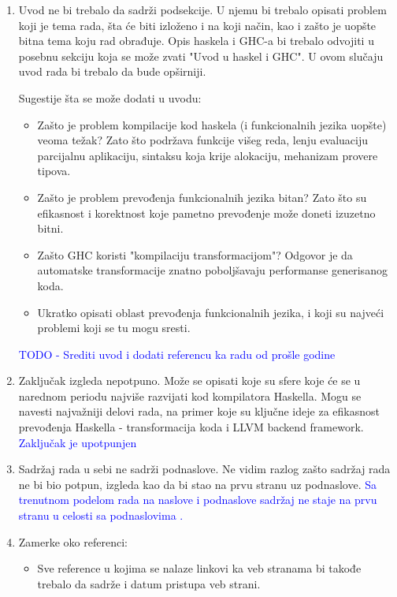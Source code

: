 \documentclass[a4paper]{report}
\newcommand{\odgovor}[1]{\textcolor{blue}{#1}}
\begin{document}
	\begin{enumerate}  
		
		\item Uvod ne bi trebalo da sadrži podsekcije. U njemu bi trebalo opisati problem koji je tema rada, šta će biti izloženo i na koji način, kao i zašto je uopšte bitna tema koju rad obrađuje. Opis haskela i GHC-a bi trebalo odvojiti u posebnu sekciju koja se može zvati "Uvod u haskel i GHC". U ovom slučaju uvod rada bi trebalo da bude opširniji. 
		
		Sugestije šta se može dodati u uvodu:
		\begin{itemize}
			\item Zašto je problem kompilacije kod haskela (i funkcionalnih jezika uopšte) veoma težak? Zato što podržava funkcije višeg reda, lenju evaluaciju parcijalnu aplikaciju, sintaksu koja krije alokaciju, mehanizam provere tipova.
			
			\item Zašto je problem prevođenja funkcionalnih jezika bitan? Zato što su efikasnost i korektnost koje pametno prevođenje može doneti izuzetno bitni. 
			
			\item Zašto GHC koristi "kompilaciju transformacijom"? Odgovor je da automatske transformacije znatno poboljšavaju performanse generisanog koda.
			
			\item Ukratko opisati oblast prevođenja funkcionalnih jezika, i koji su najveći problemi koji se tu mogu sresti.
		\end{itemize}
		\odgovor{TODO - Srediti uvod i dodati referencu ka radu od prošle godine}
		
		
		\item Zaključak izgleda nepotpuno. Može se opisati koje su sfere koje će se u narednom periodu najviše razvijati kod kompilatora Haskella. Mogu se navesti najvažniji delovi rada, na primer koje su ključne ideje za efikasnost prevođenja Haskella - transformacija koda i LLVM backend framework.
		\odgovor{Zaključak je upotpunjen}
		
		
		\item Sadržaj rada u sebi ne sadrži podnaslove. Ne vidim razlog zašto sadržaj rada ne bi bio potpun, izgleda kao da bi stao na prvu stranu uz podnaslove.
		\odgovor{Sa trenutnom podelom rada na naslove i podnaslove sadržaj ne staje na prvu stranu u celosti sa podnaslovima .}
		
		\item Zamerke oko referenci:
		\begin{itemize}
			\item Sve reference u kojima se nalaze linkovi ka veb stranama bi takođe trebalo da sadrže i datum pristupa veb strani.
			

\end{itemize}
\end{enumerate}
\end{document}

